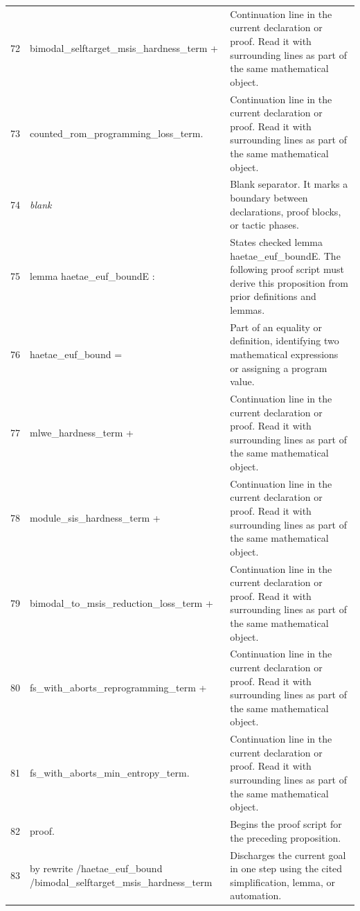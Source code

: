 \documentclass[10pt]{article}
\begin{document}
\begin{longtable}{r L{0.53\textwidth} L{0.37\textwidth}}
72 & {\ttfamily\scriptsize   bimodal\_selftarget\_msis\_hardness\_term +} & Continuation line in the current declaration or proof.  Read it with surrounding lines as part of the same mathematical object. \\
73 & {\ttfamily\scriptsize   counted\_rom\_programming\_loss\_term.} & Continuation line in the current declaration or proof.  Read it with surrounding lines as part of the same mathematical object. \\
74 & {\ttfamily\scriptsize \emph{blank}} & Blank separator.  It marks a boundary between declarations, proof blocks, or tactic phases. \\
75 & {\ttfamily\scriptsize lemma haetae\_euf\_boundE :} & States checked lemma haetae\_euf\_boundE.  The following proof script must derive this proposition from prior definitions and lemmas. \\
76 & {\ttfamily\scriptsize   haetae\_euf\_bound =} & Part of an equality or definition, identifying two mathematical expressions or assigning a program value. \\
77 & {\ttfamily\scriptsize     mlwe\_hardness\_term +} & Continuation line in the current declaration or proof.  Read it with surrounding lines as part of the same mathematical object. \\
78 & {\ttfamily\scriptsize     module\_sis\_hardness\_term +} & Continuation line in the current declaration or proof.  Read it with surrounding lines as part of the same mathematical object. \\
79 & {\ttfamily\scriptsize     bimodal\_to\_msis\_reduction\_loss\_term +} & Continuation line in the current declaration or proof.  Read it with surrounding lines as part of the same mathematical object. \\
80 & {\ttfamily\scriptsize     fs\_with\_aborts\_reprogramming\_term +} & Continuation line in the current declaration or proof.  Read it with surrounding lines as part of the same mathematical object. \\
81 & {\ttfamily\scriptsize     fs\_with\_aborts\_min\_entropy\_term.} & Continuation line in the current declaration or proof.  Read it with surrounding lines as part of the same mathematical object. \\
82 & {\ttfamily\scriptsize proof.} & Begins the proof script for the preceding proposition. \\
83 & {\ttfamily\scriptsize by rewrite /haetae\_euf\_bound /bimodal\_selftarget\_msis\_hardness\_term} & Discharges the current goal in one step using the cited simplification, lemma, or automation. \\

\end{longtable}
\end{document}
